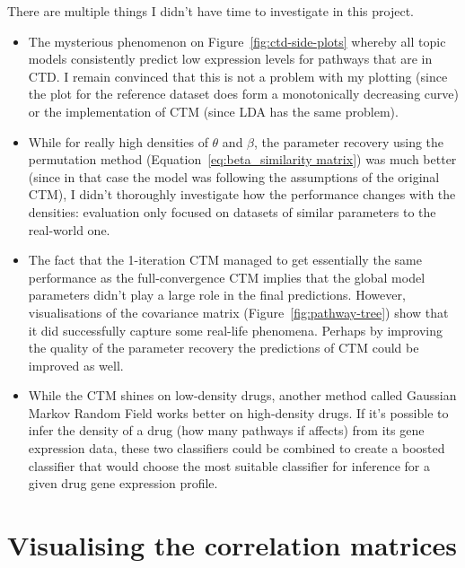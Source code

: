 \documentclass[12pt,a4paper,twoside,openright]{report}
\begin{document}
There are multiple things I didn't have time to investigate in this project.

\begin{itemize}[noitemsep]
\item The mysterious phenomenon on Figure~\ref{fig:ctd-side-plots} whereby all topic models consistently predict low expression levels for pathways that are in CTD. I remain convinced that this is not a problem with my plotting (since the plot for the reference dataset does form a monotonically decreasing curve) or the implementation of CTM (since LDA has the same problem).
\item While for really high densities of $\theta$ and $\beta$, the parameter recovery using the permutation method (Equation~\ref{eq:beta_similarity matrix}) was much better (since in that case the model was following the assumptions of the original CTM), I didn't thoroughly investigate how the performance changes with the densities: evaluation only focused on datasets of similar parameters to the real-world one.
\item The fact that the 1-iteration CTM managed to get essentially the same performance as the full-convergence CTM implies that the global model parameters didn't play a large role in the final predictions. However, visualisations of the covariance matrix (Figure~\ref{fig:pathway-tree}) show that it did successfully capture some real-life phenomena. Perhaps by improving the quality of the parameter recovery the predictions of CTM could be improved as well.
\item While the CTM shines on low-density drugs, another method called Gaussian Markov Random Field \cite{C4MB00014E} works better on high-density drugs. If it's possible to infer the density of a drug (how many pathways if affects) from its gene expression data, these two classifiers could be combined to create a boosted classifier that would choose the most suitable classifier for inference for a given drug gene expression profile.
\end{itemize}





\appendix

\chapter{Visualising the correlation matrices}
\end{document}
